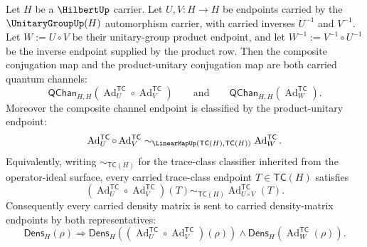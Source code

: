 \begin{theorem}
\label{thm:unitary-conjugation-channel-composition-law}
Let $H$ be a $\HilbertUp$ carrier. Let $U,V:H\to H$ be endpoints carried by the $\UnitaryGroupUp(H)$ automorphism carrier, with carried inverses $U^{-1}$ and $V^{-1}$. Let $W:=U\circ V$ be their unitary-group product endpoint, and let $W^{-1}:=V^{-1}\circ U^{-1}$ be the inverse endpoint supplied by the product row. Then the composite conjugation map and the product-unitary conjugation map are both carried quantum channels:
$$
\mathsf{QChan}_{H,H}(\operatorname{Ad}^{\mathsf{TC}}_U\circ\operatorname{Ad}^{\mathsf{TC}}_V)
\qquad\text{and}\qquad
\mathsf{QChan}_{H,H}(\operatorname{Ad}^{\mathsf{TC}}_{W}).
$$
Moreover the composite channel endpoint is classified by the product-unitary endpoint:
$$
\operatorname{Ad}^{\mathsf{TC}}_U\circ\operatorname{Ad}^{\mathsf{TC}}_V
\sim_{\LinearMapUp(\mathsf{TC}(H),\mathsf{TC}(H))}
\operatorname{Ad}^{\mathsf{TC}}_{W}.
$$
Equivalently, writing $\sim_{\mathsf{TC}(H)}$ for the trace-class classifier inherited from the operator-ideal surface, every carried trace-class endpoint $T\in\mathsf{TC}(H)$ satisfies
$$
(\operatorname{Ad}^{\mathsf{TC}}_U\circ\operatorname{Ad}^{\mathsf{TC}}_V)(T)
\sim_{\mathsf{TC}(H)}
\operatorname{Ad}^{\mathsf{TC}}_{U\circ V}(T).
$$
Consequently every carried density matrix is sent to carried density-matrix endpoints by both representatives:
$$
\mathsf{Dens}_H(\rho)
\Longrightarrow
\mathsf{Dens}_H((\operatorname{Ad}^{\mathsf{TC}}_U\circ\operatorname{Ad}^{\mathsf{TC}}_V)(\rho))
\land
\mathsf{Dens}_H(\operatorname{Ad}^{\mathsf{TC}}_{W}(\rho)).
$$
\end{theorem}
